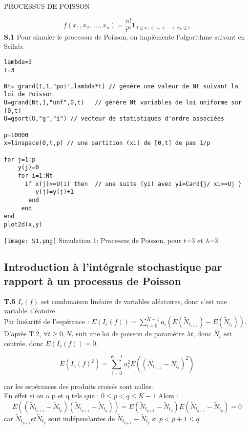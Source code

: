 PROCESSUS DE POISSON\documentclass[a4paper,10pt]{article}
\begin{document}
$$
f(x_1,x_2,\ \ldots,x_n)=\frac{n!}{t^n}\textbf{1}_{0\leq x_{1}<x_{2}<\cdots<x_{n}\leq t}
$$
$$
$$
\newpage
\textbf{S.1} Pour simuler le processus de Poisson, on implémente l'algorithme suivant en Scilab:
\begin{lstlisting}
lambda=3
t=3

Nt= grand(1,1,"poi",lambda*t) // génère une valeur de Nt suivant la loi de Poisson
U=grand(Nt,1,"unf",0,t)   // génère Nt variables de loi uniforme sur [0,t]
U=gsort(U,"g","i") // vecteur de statistiques d'ordre associées

p=10000
x=linspace(0,t,p) // une partition (xi) de [0,t] de pas 1/p

for j=1:p
    y(j)=0
    for i=1:Nt
      if x(j)>=U(i) then  // une suite (yi) avec yi=Card{j/ xi>=Uj }
         y(j)=y(j)+1
       end
     end
end
plot2d(x,y)

\end{lstlisting}

\begin{center}
\texttt{[image: S1.png]}
Simulation 1: Processus de Poisson, pour t=3 et $\lambda$=3
\end{center}
\newpage

\subsection[Introduction à l'intégrale stochastiqe]{Introduction à l'intégrale stochastique par rapport à un processus de Poisson}
\textbf{T.5}  $I_e(f)$ est combinaison lin\'eaire de variables al\'eatoires, donc c'est une variable al\'eatoire.\\

Par linéarité de l'espérance : $E(I_e(f))=\sum_{i=0}^{K-1} a_i(E(\tilde{N}_{t_{i+1}})-E(\tilde{N}_{t_i}))$.\\

D'après  T.2,  $\forall t\ge0,  N_t$ suit une loi de poisson de param\`etre $\lambda t$, donc $\tilde{N}_t$ est centr\'ee, donc $E(I_e(f))=0$.

$$E(I_e(f)^2)=\sum_{i=0}^{K-1}a_i^2E((\tilde{N}_{t_{i+1}}-\tilde{N}_{t_i})^2)
$$ 

car les esp\'erances des produits crois\'es sont nulles.\\

En effet si on a p et q tels que : $0\le p<q\le{K-1}$ Alors : $$ E((\tilde{N}_{t_{p+1}}-\tilde{N}_{t_p})(\tilde{N}_{t_{q+1}}-\tilde{N}_{t_q}))=E(\tilde{N}_{t_{p+1}}-\tilde{N}_{t_p})E(\tilde{N}_{t_{q+1}}-\tilde{N}_{t_q}) =0$$ car $\tilde{N}_{t_{p+1}} et\tilde{N}_{t_{p}}$ sont ind\'ependantes de $\tilde{N}_{t_{q+1}}-\tilde{N}_{t_q} $  si $p<p+1\le q$\\
\end{document}
